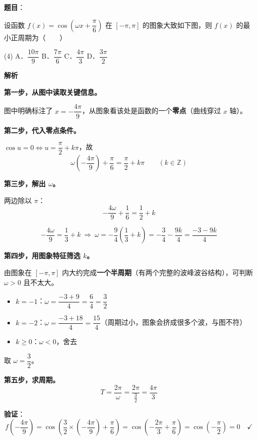 \begin{answer}

\textbf{题目}：

设函数 $f(x)=\cos\left(\omega x+\dfrac\pi6\right)$ 在 $[-\pi,\pi]$ 的图象大致如下图，则 $f(x)$ 的最小正周期为\mbox{（　　）}
\nopagebreak[4]
\begin{center}\end{center}
\nopagebreak[4]
\begin{gkopts}(4)
\task A．$\dfrac{10\pi}9$
\task B．$\dfrac{7\pi}6$
\task C．$\dfrac{4\pi}3$
\task D．$\dfrac{3\pi}2$
\end{gkopts}

\textbf{解析}

\textbf{第一步，从图中读取关键信息。}

图中明确标注了 $x=-\dfrac{4\pi}9$，从图象看该处是函数的一个\textbf{零点}（曲线穿过 $x$ 轴）。

\textbf{第二步，代入零点条件。}

$\cos u=0\iff u=\dfrac\pi2+k\pi$，故
\nopagebreak[4]
\[\omega\left(-\frac{4\pi}9\right)+\frac\pi6=\frac\pi2+k\pi\qquad(k\in\mathbb Z)\]

\textbf{第三步，解出 $\omega$。}

两边除以 $\pi$：
\nopagebreak[4]
\[-\frac{4\omega}9+\frac16=\frac12+k\]

\nopagebreak[4]
\[-\frac{4\omega}9=\frac13+k\ \Longrightarrow\ \omega=-\frac94\left(\frac13+k\right)=-\frac34-\frac{9k}4=\frac{-3-9k}4\]

\textbf{第四步，用图象特征筛选 $k$。}

由图象在 $[-\pi,\pi]$ 内大约完成\textbf{一个半周期}（有两个完整的波峰波谷结构），可判断 $\omega>0$ 且不太大。

\begin{itemize}
\item $k=-1$：$\omega=\dfrac{-3+9}4=\dfrac64=\dfrac32$ 
\item $k=-2$：$\omega=\dfrac{-3+18}4=\dfrac{15}4$（周期过小，图象会挤成很多个波，与图不符）
\item $k\ge0$：$\omega<0$，舍去
\end{itemize}

取 $\omega=\dfrac32$。

\textbf{第五步，求周期。}
\nopagebreak[4]
\[T=\frac{2\pi}\omega=\frac{2\pi}{\frac32}=\frac{4\pi}3\]

\textbf{验证}：
\nopagebreak[4]
\[f\left(-\frac{4\pi}9\right)=\cos\left(\frac32\times\left(-\frac{4\pi}9\right)+\frac\pi6\right)=\cos\left(-\frac{2\pi}3+\frac\pi6\right)=\cos\left(-\frac\pi2\right)=0\quad\checkmark\]


\end{answer}
